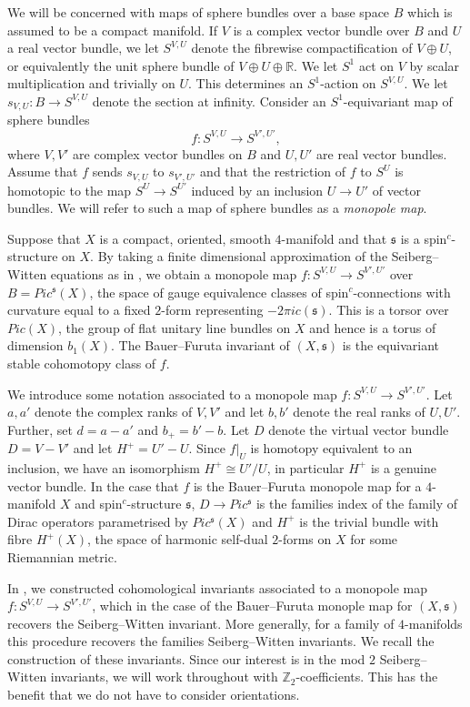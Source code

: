 \documentclass{amsart}
\theoremstyle{definition}
\theoremstyle{remark}
\numberwithin{equation}{section}
\begin{document}
We will be concerned with maps of sphere bundles over a base space $B$ which is assumed to be a compact manifold. If $V$ is a complex vector bundle over $B$ and $U$ a real vector bundle, we let $S^{V,U}$ denote the fibrewise compactification of $V \oplus U$, or equivalently the unit sphere bundle of $V \oplus U \oplus \mathbb{R}$. We let $S^1$ act on $V$ by scalar multiplication and trivially on $U$. This determines an $S^1$-action on $S^{V,U}$. We let $s_{V,U} : B \to S^{V,U}$ denote the section at infinity. Consider an $S^1$-equivariant map of sphere bundles 
\[
f : S^{V,U} \to S^{V',U'},
\]
where $V,V'$ are complex vector bundles on $B$ and $U,U'$ are real vector bundles. Assume that $f$ sends $s_{V,U}$ to $s_{V',U'}$ and that the restriction of $f$ to $S^{U}$ is homotopic to the map $S^U \to S^{U'}$ induced by an inclusion $U \to U'$ of vector bundles. We will refer to such a map of sphere bundles as a {\em monopole map}.

Suppose that $X$ is a compact, oriented, smooth $4$-manifold and that $\mathfrak{s}$ is a spin$^c$-structure on $X$. By taking a finite dimensional approximation of the Seiberg--Witten equations as in \cite{bf}, we obtain a monopole map $f : S^{V,U} \to S^{V' , U'}$ over $B = Pic^{\mathfrak{s}}(X)$, the space of gauge equivalence classes of spin$^c$-connections with curvature equal to a fixed $2$-form representing $-2\pi i c(\mathfrak{s})$. This is a torsor over $Pic(X)$, the group of flat unitary line bundles on $X$ and hence is a torus of dimension $b_1(X)$. The Bauer--Furuta invariant of $(X,\mathfrak{s})$ is the equivariant stable cohomotopy class of $f$.

We introduce some notation associated to a monopole map $f : S^{V,U} \to S^{V',U'}$. Let $a,a'$ denote the complex ranks of $V,V'$ and let $b,b'$ denote the real ranks of $U,U'$. Further, set $d = a-a'$ and $b_+ = b'-b$. Let $D$ denote the virtual vector bundle $D = V - V'$ and let $H^+ = U' - U$. Since $f|_U$ is homotopy equivalent to an inclusion, we have an isomorphism $H^+ \cong U'/U$, in particular $H^+$ is a genuine vector bundle. In the case that $f$ is the Bauer--Furuta monopole map for a $4$-manifold $X$ and spin$^c$-structure $\mathfrak{s}$, $D \to Pic^{\mathfrak{s}}$ is the families index of the family of Dirac operators parametrised by $Pic^{\mathfrak{s}}(X)$ and $H^+$ is the trivial bundle with fibre $H^+(X)$, the space of harmonic self-dual $2$-forms on $X$ for some Riemannian metric.

In \cite{bk}, we constructed cohomological invariants associated to a monopole map $f : S^{V,U} \to S^{V',U'}$, which in the case of the Bauer--Furuta monople map for $(X,\mathfrak{s})$ recovers the Seiberg--Witten invariant. More generally, for a family of $4$-manifolds this procedure recovers the families Seiberg--Witten invariants. We recall the construction of these invariants. Since our interest is in the mod $2$ Seiberg--Witten invariants, we will work throughout with $\mathbb{Z}_2$-coefficients. This has the benefit that we do not have to consider orientations.
\end{document}
